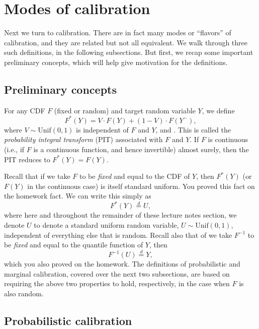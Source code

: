 \documentclass{article}
\begin{document}
\section{Modes of calibration}

Next we turn to calibration. There are in fact many modes or ``flavors'' of
calibration, and they are related but not all equivalent. We walk through three
such definitions, in the following subsections. But first, we recap some
important preliminary concepts, which will help give motivation for the
definitions.    

\subsection{Preliminary concepts}

\def\deq{\overset{d}{=}}

For any CDF $F$ (fixed or random) and target random variable $Y$, we define  
\begin{equation}
\label{eq:pit}
F^*(Y) = V \cdot F(Y) + (1-V) \cdot F(Y^-),
\end{equation}
where $V \sim \mathrm{Unif}(0,1)$ is independent of $F$ and $Y$, and
. This is called the \emph{probability
  integral transform} (PIT) associated with $F$ and $Y$. If $F$ is continuous
(i.e., if $F$ is a continuous function, and hence invertible) almost surely,
then the PIT reduces to $F^*(Y) = F(Y)$.    

Recall that if we take $F$ to be \emph{fixed} and equal to the CDF of $Y$, then
$F^*(Y)$ (or $F(Y)$ in the continuous case) is itself standard uniform. You
proved this fact on the homework fact. We can write this simply as   
\[
F^*(Y) \deq U,
\]
where here and throughout the remainder of these lecture notes section, we
denote $U$ to denote a standard uniform random variable, $U \sim
\mathrm{Unif}(0,1)$, independent of everything else that is random. Recall also
that of we take $F^{-1}$ to be \emph{fixed} and equal to the quantile function
of $Y$, then  
\[
F^{-1}(U) \deq Y,
\]
which you also proved on the homework. The definitions of probabilistic and
marginal calibration, covered over the next two subsections, are based on
requiring the above two properties to hold, respectively, in the case when $F$
is also random.   

\subsection{Probabilistic calibration}
\end{document}
